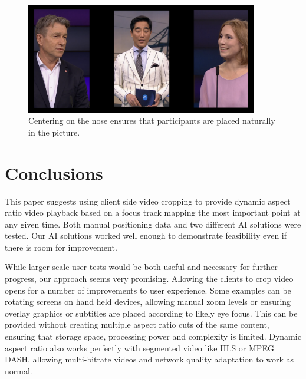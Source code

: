 \documentclass{aircc}
\begin{document}
\begin{figure}
\begin{center}
\includegraphics[width=0.9\textwidth]{nose_center.png}
\caption{Centering on the nose ensures that participants are placed naturally
 in the picture.}
\label{nose_center}
\end{center}
\end{figure}



\section{Conclusions}

This paper suggests using client side video cropping to provide dynamic aspect
ratio video playback based on a focus track mapping the most important point
at any given time. Both manual positioning data and two different AI
solutions were tested. Our AI solutions worked well enough to demonstrate
feasibility even if there is room for improvement.

While larger scale user tests would be both useful and necessary for further
progress, our approach seems very promising. Allowing the clients to crop
video opens for a number of improvements to user experience. Some examples
can be rotating screens on hand held devices, allowing manual zoom levels or
ensuring overlay graphics or subtitles are placed according to likely eye
focus. This can be provided without creating multiple aspect ratio cuts of
the same content, ensuring that storage space, processing power and
complexity is limited. Dynamic aspect ratio also works perfectly with
segmented video like HLS or MPEG DASH, allowing multi-bitrate videos and
network quality adaptation to work as normal. 
\end{document}

